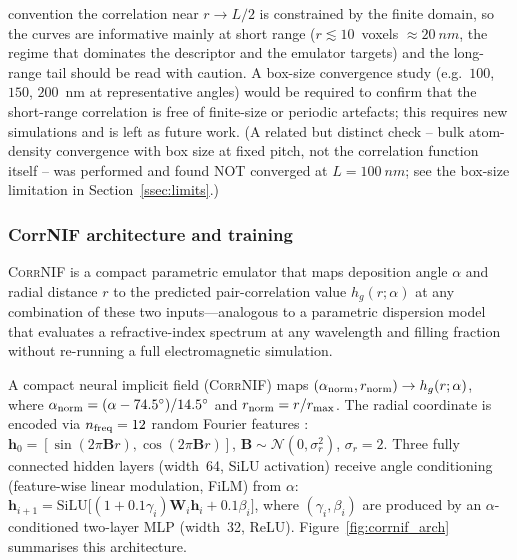 \documentclass[aip,amsmath,amssymb,reprint]{revtex4-1}
\newcommand{\dang}{\ensuremath{\alpha}}
\begin{document}
convention the correlation near $r\to L/2$ is constrained by the finite
domain, so the curves are informative mainly at short range
($r \lesssim 10$~voxels $\approx\SI{20}{nm}$, the regime that dominates the
descriptor and the emulator targets) and the long-range tail should be read
with caution.  A box-size convergence study (e.g.\ $100$, $150$, $200$~nm at
representative angles) would be required to confirm that the short-range
correlation is free of finite-size or periodic artefacts; this requires new
simulations and is left as future work. (A related but distinct check --
bulk atom-density convergence with box size at fixed pitch, not the
correlation function itself -- was performed and found NOT converged at
$L=\SI{100}{nm}$; see the box-size limitation in Section~\ref{ssec:limits}.)

\subsubsection*{CorrNIF architecture and training}

\textsc{CorrNIF} is a compact parametric emulator that maps deposition
angle $\dang$ and radial distance $r$ to the predicted pair-correlation
value $h_g(r;\dang)$ at any combination of these two inputs---analogous
to a parametric dispersion model that evaluates a refractive-index
spectrum at any wavelength and filling fraction without re-running a
full electromagnetic simulation.

A compact neural implicit field (\textsc{CorrNIF}) maps
$(\dang_{\rm norm}, r_{\rm norm}) \to h_g(r;\dang)$, where
$\dang_{\rm norm} = (\dang - 74.5^{\circ})/14.5^{\circ}$ and
$r_{\rm norm} = r/r_{\rm max}$.
The radial coordinate is encoded via $n_{\rm freq} = 12$ random Fourier
features \citep{tancik2020}:
$\mathbf{h}_0 = [\sin(2\pi\mathbf{B}r),\cos(2\pi\mathbf{B}r)]$,
$\mathbf{B} \sim \mathcal{N}(0,\sigma_r^2)$, $\sigma_r = 2$.
Three fully connected hidden layers (width~64, SiLU activation) receive
angle conditioning (feature-wise linear modulation, FiLM) from $\dang$:
$\mathbf{h}_{i+1} =
  \mathrm{SiLU}\!\bigl[(1+0.1\gamma_i)\mathbf{W}_i\mathbf{h}_i
  + 0.1\beta_i\bigr]$,
where $(\gamma_i,\beta_i)$ are produced by an $\dang$-conditioned
two-layer MLP (width~32, ReLU).
Figure~\ref{fig:corrnif_arch} summarises this architecture.
\end{document}
